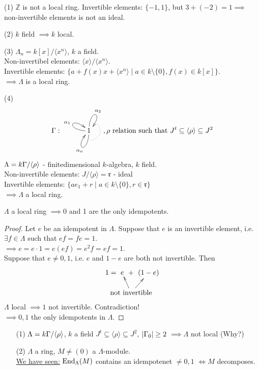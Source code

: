 \begin{exam}
(1) $\mathbb{Z}$ is not a local ring. Invertible elements: $\{ -1, 1
\}$, but $3 + (-2) = 1 \implies 	$ non-invertible elements is
not an ideal. 

(2) $k$ field $\implies k$ local.

(3) $\Lambda_n = k[x]/\langle x^n \rangle$, $k$ a field.\\
Non-invertibel elements: $\langle x \rangle / \langle x^n \rangle$.\\
Invertible elements: $\{ a + f(x)x + \langle x^n \rangle \mid  a \in k\setminus \{ 0 \}, f(x) \in k[x] \}$.\\
$\implies \Lambda$ is a local ring.

(4) $$\G : 
\vcenter{\xy\xymatrix{
1 \ar@(l,ul)^{\alpha_1} \ar@(u,ur)^{\alpha_2} \ar@(d,dl)^{\alpha_n}
}
\POS(3, 5)
\xymatrix"an"{{}}
\POS(0, -5)
\xymatrix"a2"{ \ar@{.}@/_1pc/["an"]}
\endxy
}, \rho \text{ relation such that } J^t \subseteq \langle \rho \rangle \subseteq J^2$$
$\Lambda = k\Gamma / \langle \rho \rangle$ - finitedimensional $k$-algebra, $k$ field.\\
Non-invertible elements: $J / \langle \rho \rangle = \mathfrak{r}$ - ideal\\
Invertible elements: $\{ ae_1 + r \mid a \in k \setminus \{ 0 \}, r \in \mathfrak{r} \}$\\
$\implies \Lambda$ a local ring.
\end{exam}

\begin{prop}\label{prop:35}
$\Lambda$ a local ring $\implies 0$ and 1 are the only idempotents.
\begin{proof}
  Let $e$ be an idempotent in $\Lambda$. Suppose that $e$ is an invertible element, i.e. $\exists f \in \Lambda$ such that $ef = fe = 1$.\\
  $\implies e = e\cdot 1 = e(ef) = e^2f = ef = 1$.\\
  Suppose that $e \neq 0,1$, i.e. $e$ and $1-e$ are both not
  invertible. Then \[\xy\xymatrix"eq"@C-2pc{1 = & e &+ & (1-e)}
  \POS+(10, -10) \xymatrix{\text{not invertible} \ar["eq"r]
    \ar["eq"rrr]}
\endxy\]
$\Lambda$ local $\implies 1$ not invertible. Contradiction!\\
$\implies 0,1$ the only idempotents in $\Lambda$.
\end{proof}
\end{prop}

\begin{note}
\begin{enumerate}
\item[(1)] $\Lambda = k\Gamma / \langle \rho \rangle$, $k$ a field $J^t \subseteq \langle \rho \rangle \subseteq J^2$, $|\Gamma_0| \geq 2$ $\implies \Lambda$ not local (Why?)
\item[(2)] $\Lambda$ a ring, $M \neq (0)$ a $\Lambda$-module.\\
\underline{We have seen:} $\operatorname{End}_\Lambda(M)$ contains an idempotenet $\neq 0,1$ $\iff M$ decomposes.
\end{enumerate}
\end{note}

